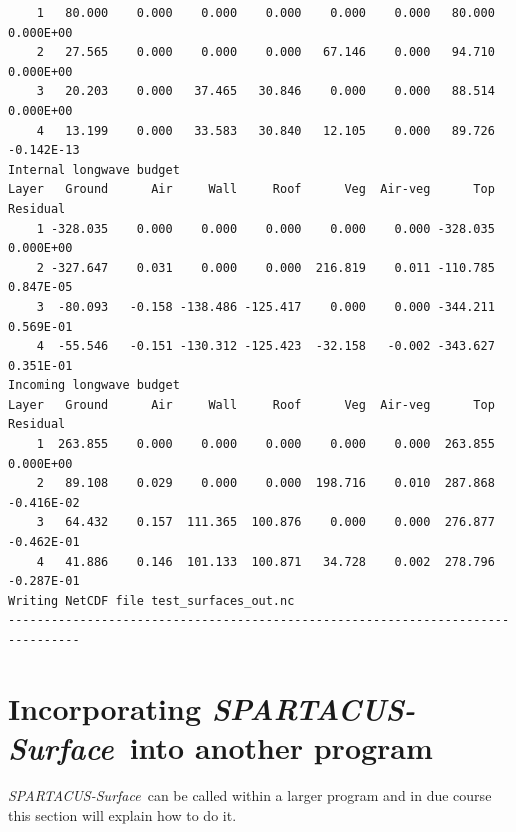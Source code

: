 \documentclass[a4,oneside]{article}
\def\spsurf{\emph{SPARTACUS-Surface}}
\begin{document}
\begin{verbatim}
    1   80.000    0.000    0.000    0.000    0.000    0.000   80.000  0.000E+00
    2   27.565    0.000    0.000    0.000   67.146    0.000   94.710  0.000E+00
    3   20.203    0.000   37.465   30.846    0.000    0.000   88.514  0.000E+00
    4   13.199    0.000   33.583   30.840   12.105    0.000   89.726 -0.142E-13
Internal longwave budget
Layer   Ground      Air     Wall     Roof      Veg  Air-veg      Top   Residual
    1 -328.035    0.000    0.000    0.000    0.000    0.000 -328.035  0.000E+00
    2 -327.647    0.031    0.000    0.000  216.819    0.011 -110.785  0.847E-05
    3  -80.093   -0.158 -138.486 -125.417    0.000    0.000 -344.211  0.569E-01
    4  -55.546   -0.151 -130.312 -125.423  -32.158   -0.002 -343.627  0.351E-01
Incoming longwave budget
Layer   Ground      Air     Wall     Roof      Veg  Air-veg      Top   Residual
    1  263.855    0.000    0.000    0.000    0.000    0.000  263.855  0.000E+00
    2   89.108    0.029    0.000    0.000  198.716    0.010  287.868 -0.416E-02
    3   64.432    0.157  111.365  100.876    0.000    0.000  276.877 -0.462E-01
    4   41.886    0.146  101.133  100.871   34.728    0.002  278.796 -0.287E-01
Writing NetCDF file test_surfaces_out.nc
--------------------------------------------------------------------------------

\end{verbatim}
\normalsize

\section{Incorporating \spsurf\ into another program}
\label{sec:api}

\spsurf\ can be called within a larger program and in due course this
section will explain how to do it.
\end{document}
